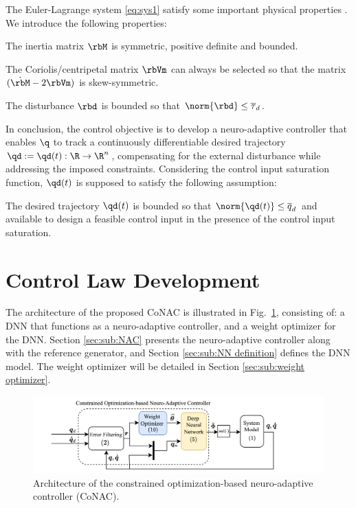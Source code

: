 \documentclass[final,5p,times,twocolumn,authoryear]{elsarticle}
\begin{document}
The Euler-Lagrange system \eqref{eq:sys1} satisfy some important physical properties \cite[see, Chap. 3 Tab. 3.2.1]{Lewis:1998aa}.
We introduce the following properties:
\begin{prop} 
    The inertia matrix $\rbM$ is symmetric, positive definite and bounded.
    \label{prop:M}
\end{prop}

\begin{prop} 
    The Coriolis/centripetal matrix $\rbVm$ can always be selected so that the matrix $(\dot{\rbM}-2\rbVm)$ is skew-symmetric.
    \label{prop:skew}
\end{prop}

\begin{prop}
    The disturbance $\rbd$ is bounded so that $\norm{\rbd}\le \overline\tau_d$.
    \label{prop:dis_bound}
\end{prop}

In conclusion, the control objective is to develop a neuro-adaptive controller that enables $\q$ to track a continuously differentiable desired trajectory $\qd:=\qd(t): \R \to \R^n$, compensating for the external disturbance while addressing the imposed constraints.
Considering the control input saturation function, $\qd(t)$ is supposed to satisfy the following assumption:
\begin{assum}
    The desired trajectory $\qd(t)$ is bounded so that $\norm{\qd(t)}\le \overline{q}_d$ and available to design a feasible control input in the presence of the control input saturation.
    \label{assum:feasible}
\end{assum}

\section{Control Law Development}\label{sec:ctrl design}

The architecture of the proposed CoNAC is illustrated in Fig.~\ref{fig:ctrl:diagram}, consisting of: a DNN that functions as a neuro-adaptive controller, and a weight optimizer for the DNN. 
Section \ref{sec:sub:NAC} presents the neuro-adaptive controller along with the reference generator, and Section \ref{sec:sub:NN definition} defines the DNN model. The weight optimizer will be detailed in Section \ref{sec:sub:weight optimizer}.

\begin{figure}[!t]
    \centering
    \includegraphics[width=0.8\linewidth]{src/figures/Controller.drawio.png}
    \caption{Architecture of the constrained optimization-based neuro-adaptive controller (CoNAC).}
    \label{fig:ctrl:diagram}
\end{figure}
\end{document}
